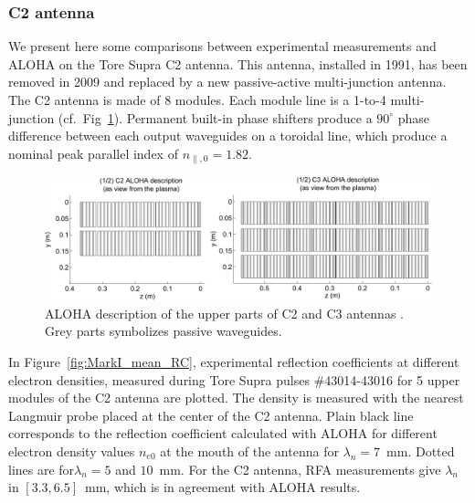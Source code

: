 \subsubsection{C2 antenna}
We present here some comparisons between experimental measurements and ALOHA on the Tore Supra C2 antenna. This antenna, installed in 1991, has been removed in 2009 and replaced by a new passive-active multi-junction antenna\cite{guilhem2009,guilhem2011}. The C2 antenna is made of 8 modules. Each module line is a 1-to-4 multi-junction (cf.~Fig~\ref{fig:geometry_TS_LHAntennas}). Permanent built-in phase shifters produce a $90^\circ$ phase difference between each output waveguides on a toroidal line, which produce a nominal peak parallel index of $n_{\parallel,0}=1.82$.

\begin{figure}[h]
	\centering
	\includegraphics[width=1.0\textwidth]{figures/chap2/Tore_Supra/geometry_TS_LHAntennas}
	\caption{ALOHA description of the upper parts of C2 and C3 antennas . Grey parts symbolizes passive waveguides.}
	\label{fig:geometry_TS_LHAntennas}
\end{figure}

In Figure~\ref{fig:MarkI_mean_RC}, experimental reflection coefficients at different electron densities, measured during Tore Supra pulses \#43014-43016 for 5 upper modules of the C2 antenna are plotted. The density is measured with the nearest Langmuir probe placed at the center of the C2 antenna. Plain black line corresponds to the reflection coefficient calculated with ALOHA for different electron density values $n_{e0}$ at the mouth of the antenna for $\lambda_n=7$~mm. Dotted lines are for$\lambda_n=5$ and $10$~mm. For the C2 antenna, RFA measurements give $\lambda_n$ in $[3.3, 6.5]$~mm, which is in agreement with ALOHA results. 

